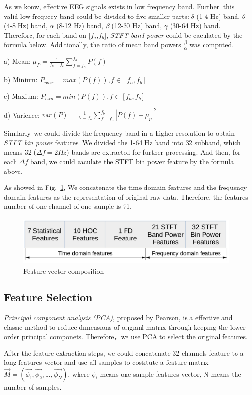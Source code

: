 \documentclass[runningheads,a4paper]{llncs}
\begin{document}
As we konw, effective EEG signals exists in low frequency band.
Further, this valid low frequecy band could be divided to five smaller parts:
$\delta$ (1-4 Hz) band, $\theta$ (4-8 Hz) band, $\alpha$ (8-12 Hz) band,
$\beta$ (12-30 Hz) band, $\gamma$ (30-64 Hz) band.
Therefore, for each band on [$f_a$,$f_b$],
\emph{STFT band power} could be caculated by the formula below. Additionally,
the ratio of mean band powers $\frac{\beta}{\alpha}$ was computed.

a) Mean: $\mu_P = \frac{1}{f_b-f_a}\sum_{f=f_a}^{f_b}P(f)$

b) Minium: $P_{max} = max(P(f)), f\in[f_a,f_b]$

c) Maxium: $P_{min} = min(P(f)), f\in[f_a,f_b]$

d) Varience: $ var(P) = \frac{1}{f_b-f_a}\sum_{f=f_a}^{f_b}|P(f)-\mu_p|^2$

Similarly, we could divide the frequency band in a higher resolution to obtain
\emph{STFT bin power} features. We divided the 1-64 Hz band into 32 subband, which
means 32 ($\Delta f = 2Hz$) bands are extracted for further processing.
And then, for each $\Delta f$ band, we could caculate the STFT bin power
feature by the formula above.

As showed in Fig.~\ref{longfeature},
We concatenate the time domain features and the frequency domain features as
the representation of original raw data. Therefore, the features number of one channel of
one sample is 71.

\begin{figure}
  \centering
  \includegraphics[height=2.5cm]{images/15}
  \caption{Feature vector composition}
  \label{longfeature}
\end{figure}

\subsection{Feature Selection}
\emph{Principal component analysis (PCA)}, proposed by Pearson\cite{PCA},
is a effective and classic method to reduce dimensions of origianl
matrix through keeping the lower order principal componets. Therefore，we use PCA to
select the original features.

After the feature extraction steps, we could concatenate 32 channels feature to
a long features vector and use all samples to costitute a feature matrix
$\vec{M} = (\vec{\phi_1}, \vec{\phi_2},..., \vec{\phi_N})$, where $\phi_i$ means
one sample features vector, N means the number of samples.
\end{document}

